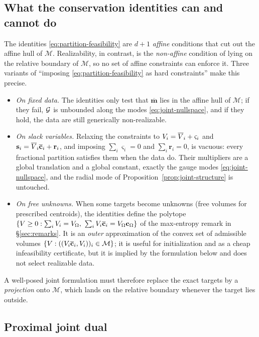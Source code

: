 \documentclass[main.tex]{subfiles}
\providecommand{\momset}{\mathcal{M}}            %
\providecommand{\tmom}{\overline{\mathbf{m}}}    %
\providecommand{\momx}{\mathbf{s}}               %
\begin{document}
\subsection{What the conservation identities can and cannot do}
\label{sec:feasibility-hard}

The identities \eqref{eq:partition-feasibility} are $d\!+\!1$ \emph{affine} conditions that cut out the affine hull of $\momset$.
Realizability, in contrast, is the \emph{non-affine} condition of lying on the relative boundary of $\momset$, so no set of affine constraints can enforce it.
Three variants of ``imposing \eqref{eq:partition-feasibility} as hard constraints'' make this precise.
\begin{itemize}
  \item \emph{On fixed data.} The identities only test that $\tmom$ lies in the affine hull of $\momset$; if they fail, $\mathcal{G}$ is unbounded along the modes \eqref{eq:joint-nullspace}, and if they hold, the data are still generically non-realizable.
  \item \emph{On slack variables.} Relaxing the constraints to $V_i = \overline{V}_i + \varsigma_i$ and $\momx_i = \pvol_i\tcentroid_i + \mathbf{r}_i$, and imposing $\sum_i \varsigma_i = 0$ and $\sum_i \mathbf{r}_i = 0$, is vacuous: every fractional partition satisfies them when the data do. Their multipliers are a global translation and a global constant, \ie exactly the gauge modes \eqref{eq:joint-nullspace}, and the radial mode of Proposition~\ref{prop:joint-structure} is untouched.
  \item \emph{On free unknowns.} When some targets become unknowns (\eg free volumes for prescribed centroids), the identities define the polytope $\{ V \ge 0 : \sum_i V_i = V_{\Omega},\ \sum_i V_i \overline{\mathbf{c}}_i = V_{\Omega}\mathbf{c}_\Omega \}$ of the max-entropy remark in \S\ref{sec:remarks}. It is an \emph{outer} approximation of the convex set of admissible volumes $\{\cellvol : ((\cellvol_i\tcentroid_i, \cellvol_i))_i \in \momset\}$; it is useful for initialization and as a cheap infeasibility certificate, but it is implied by the formulation below and does not select realizable data.
\end{itemize}
A well-posed joint formulation must therefore replace the exact targets by a \emph{projection} onto $\momset$, which lands on the relative boundary whenever the target lies outside.

\subsection{Proximal joint dual}
\label{sec:proximal-joint}
\end{document}
